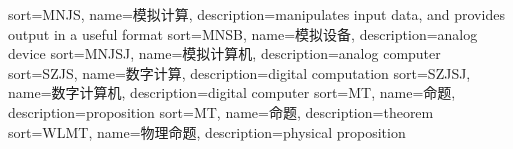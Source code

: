 {
  sort=MNJS,
  name=模拟计算,
  description={manipulates input data, and provides output in a useful format}
}
{
  sort=MNSB,
  name=模拟设备,
  description={analog device}
}
{
  sort=MNJSJ,
  name=模拟计算机,
  description={analog computer}
}
{
  sort=SZJS,
  name=数字计算,
  description={digital computation}
}
{
  sort=SZJSJ,
  name=数字计算机,
  description={digital computer}
}
{
  sort=MT,
  name=命题,
  description={proposition}
}
{
  sort=MT,
  name=命题,
  description={theorem}
}
{
  sort=WLMT,
  name=物理命题,
  description={physical proposition}
}

